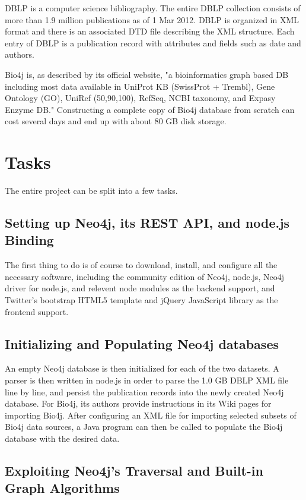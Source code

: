 \documentclass[10pt, conference, compsocconf]{IEEEtran}
\begin{document}
DBLP is a computer science bibliography. The entire DBLP collection consists of more than 1.9 million publications as of 1 Mar 2012. DBLP is organized in XML format and there is an associated DTD file describing the XML structure. Each entry of DBLP is a publication record with attributes and fields such as date and authors.

Bio4j is, as described by its official website, "a bioinformatics graph based DB including most data available in UniProt KB (SwissProt + Trembl), Gene Ontology (GO), UniRef (50,90,100), RefSeq, NCBI taxonomy, and Expasy Enzyme DB." Constructing a complete copy of Bio4j database from scratch can cost several days and end up with about 80 GB disk storage.

\section{Tasks}

The entire project can be split into a few tasks.

\subsection{Setting up Neo4j, its REST API, and node.js Binding}

The first thing to do is of course to download, install, and configure all the necessary software, including the community edition of Neo4j, node.js, Neo4j driver for node.js, and relevent node modules as the backend support, and Twitter's bootstrap HTML5 template and jQuery JavaScript library as the frontend support.

\subsection{Initializing and Populating Neo4j databases}

An empty Neo4j database is then initialized for each of the two datasets. A parser is then written in node.js in order to parse the 1.0 GB DBLP XML file line by line, and persist the publication records into the newly created Neo4j database. For Bio4j, its authors provide instructions in its Wiki pages for importing Bio4j. After configuring an XML file for importing selected subsets of Bio4j data sources, a Java program can then be called to populate the Bio4j database with the desired data.

\subsection{Exploiting Neo4j's Traversal and Built-in Graph Algorithms}
\end{document}
